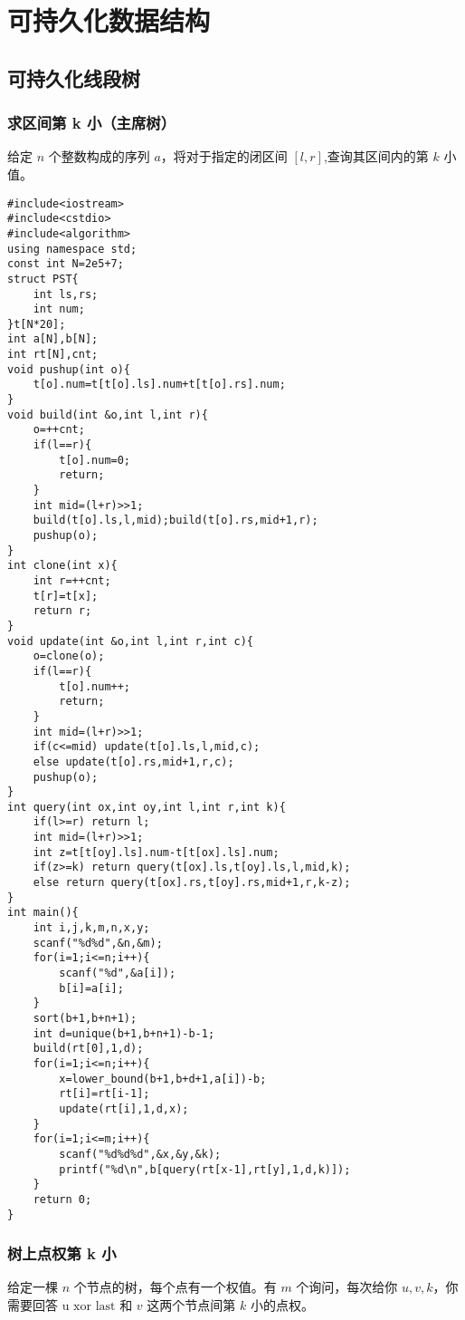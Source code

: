 \section{可持久化数据结构}
\subsection{可持久化线段树}
\subsubsection{求区间第 k 小（主席树）}
	给定 $n$ 个整数构成的序列 $a$，将对于指定的闭区间 $[l,r]$,查询其区间内的第 $k$ 小值。
	\begin{lstlisting}
#include<iostream>
#include<cstdio>
#include<algorithm>
using namespace std; 
const int N=2e5+7;
struct PST{
	int ls,rs;
	int num;
}t[N*20];
int a[N],b[N];
int rt[N],cnt;
void pushup(int o){
	t[o].num=t[t[o].ls].num+t[t[o].rs].num;
}
void build(int &o,int l,int r){
	o=++cnt;
	if(l==r){
		t[o].num=0;
		return;
	}
	int mid=(l+r)>>1;
	build(t[o].ls,l,mid);build(t[o].rs,mid+1,r);
	pushup(o);
}
int clone(int x){
	int r=++cnt;
	t[r]=t[x];
	return r;
}
void update(int &o,int l,int r,int c){
	o=clone(o);
	if(l==r){
		t[o].num++;
		return;
	}
	int mid=(l+r)>>1;
	if(c<=mid) update(t[o].ls,l,mid,c);
	else update(t[o].rs,mid+1,r,c);
	pushup(o);
}
int query(int ox,int oy,int l,int r,int k){
	if(l>=r) return l;
	int mid=(l+r)>>1;
	int z=t[t[oy].ls].num-t[t[ox].ls].num;
	if(z>=k) return query(t[ox].ls,t[oy].ls,l,mid,k);
	else return query(t[ox].rs,t[oy].rs,mid+1,r,k-z);
}
int main(){
	int i,j,k,m,n,x,y;
	scanf("%d%d",&n,&m);
	for(i=1;i<=n;i++){
		scanf("%d",&a[i]);
		b[i]=a[i];
	}
	sort(b+1,b+n+1);
	int d=unique(b+1,b+n+1)-b-1;
	build(rt[0],1,d);
	for(i=1;i<=n;i++){
		x=lower_bound(b+1,b+d+1,a[i])-b;
		rt[i]=rt[i-1];
		update(rt[i],1,d,x);
	}
	for(i=1;i<=m;i++){
		scanf("%d%d%d",&x,&y,&k);
		printf("%d\n",b[query(rt[x-1],rt[y],1,d,k)]);
	}
	return 0;
}\end{lstlisting}

\subsubsection{树上点权第 k 小}
	给定一棵 $n$ 个节点的树，每个点有一个权值。有 $m$ 个询问，每次给你 $u,v,k$，你需要回答 $\text{u xor last}$ 和 $v$ 这两个节点间第 $k$ 小的点权。
	
